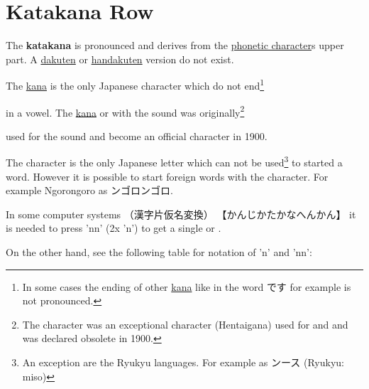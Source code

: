\section{Katakana  Row}\label{sec:KatakanaNrow}


 The  \textbf{katakana}  is pronounced  
and  derives from the \hyperref[sec:PhoneticCharacter]{phonetic character}s
 upper part.  A \hyperref[sec:Dakuten]{dakuten} or
\hyperref[sec:Handakuten]{handakuten} version do not exist.

The \hyperref[sec:Kana]{kana}   is the only Japanese
character which do not end\footnote{%

In some cases the ending of other \hyperref[sec:Kana]{kana} like
 in the word {です} for example is not pronounced.

}%

in a vowel. The \hyperref[sec:Kana]{kana}  or
 with the sound  was originally\footnote{%

The character  was an exceptional character (Hentaigana)
used for  and  and was declared obsolete in 1900.

}%

used for the  sound and become an official character in 1900.

The  character is the only Japanese letter which can not be
used\footnote{An exception are the Ryukyu languages. For example  as
ンース (Ryukyu: miso) } to started a word. However it is possible to start
foreign words with the  character. For example Ngorongoro as
ンゴロンゴロ.

In some computer systems {（漢字片仮名変換）} {【かんじかたかなへんかん】} it
is needed to press 'nn' (2x 'n') to get a single  or
.

On the other hand, see the following table for notation of 'n' and 'nn':
\bigskip


